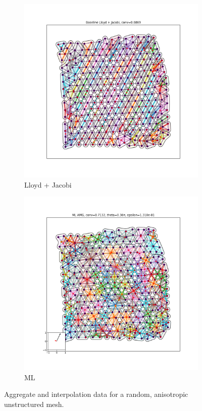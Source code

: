 \documentclass{article}
\begin{document}
\begin{figure}[h]
  \centering
  \begin{subfigure}[t]{0.49\textwidth}
    \centering
    \includegraphics[width=\textwidth, trim=80 70 70 50, clip]{anis_grid_4_lloyd.pdf}
    \caption{Lloyd + Jacobi}
  \end{subfigure}
  \begin{subfigure}[t]{0.49\textwidth}
    \centering
    \includegraphics[width=\textwidth, trim=80 70 70 50, clip]{anis_grid_4_ml.pdf}
    \caption{ML}
  \end{subfigure}
  \caption{Aggregate and interpolation data for a random, anisotropic unstructured mesh.}
  \label{fig:anis_grid_4}
\end{figure}
\end{document}
